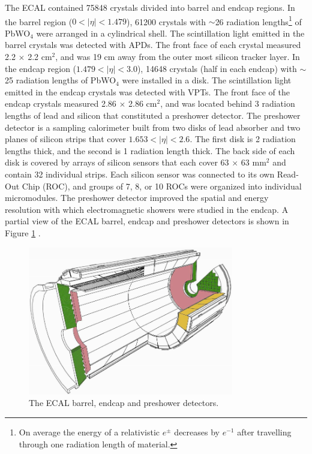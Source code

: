 The ECAL contained 75848 crystals \cite{ecalPerformanceInCollisions} divided into barrel and endcap regions.  In the barrel region 
($0 < |\eta| < 1.479$), 61200 crystals with $\sim$26 radiation lengths\footnote{On average the energy of a relativistic $e^{\pm}$ 
decreases by $e^{-1}$ after travelling through one radiation length of material.} of PbWO$_{4}$ were arranged in a cylindrical shell.  
The scintillation light emitted in the barrel crystals was detected with APDs.  The front face of each crystal measured 2.2 $\times$ 
2.2 cm$^{2}$, and was 19 cm away from the outer most silicon tracker layer.  In the endcap region ($1.479 < |\eta| < 3.0$), 14648 crystals 
(half in each endcap) with $\sim$25 radiation lengths of PbWO$_{4}$ were installed in a disk.  The scintillation light emitted in the 
endcap crystals was detected with VPTs.  The front face of the endcap crystals measured 2.86 $\times$ 2.86 cm$^{2}$, and was located behind 3 radiation 
lengths of lead and silicon that constituted a preshower detector.  The preshower detector is a sampling calorimeter built from two 
disks of lead absorber and two planes of silicon strips that cover $1.653 < |\eta| < 2.6$.  The first disk is 2 radiation lengths thick, 
and the second is 1 radiation length thick.  The back side of each disk is covered by arrays of silicon sensors that each cover 63 
$\times$ 63 mm$^{2}$ and contain 32 individual strips.  Each silicon sensor was connected to its own Read-Out Chip (ROC), and groups of 
7, 8, or 10 ROCs were organized into individual micromodules.  The preshower detector improved the spatial and energy resolution with 
which electromagnetic showers were studied in the endcap.  A partial view of the ECAL barrel, endcap and preshower detectors is shown 
in Figure \ref{fig:ecalEBEEandES} \cite{ecalTDR}.

\begin{figure}[ht]
	\centering
	\includegraphics[width=0.8\textwidth]{figures/ecalBarrelEndcapAndPreshower.png}
	\caption{The ECAL barrel, endcap and preshower detectors.}
	\label{fig:ecalEBEEandES}
\end{figure}

